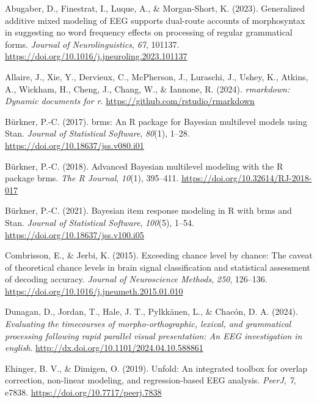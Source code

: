 \documentclass[
  doc,
  floatsintext,
  longtable,
  a4paper,
  nolmodern,
  notxfonts,
  notimes,
  colorlinks=true,linkcolor=blue,citecolor=blue,urlcolor=blue]{apa7}
\newlength{\cslhangindent}
\newenvironment{CSLReferences}[2] %
 {\begin{list}{}{%
  \setlength{\itemindent}{0pt}
  \setlength{\leftmargin}{0pt}
  \setlength{\parsep}{0pt}
  \ifodd #1
   \setlength{\leftmargin}{\cslhangindent}
   \setlength{\itemindent}{-1\cslhangindent}
  \fi
  \setlength{\itemsep}{#2\baselineskip}}}
 {\end{list}}
\begin{document}
\label{refs}
\begin{CSLReferences}{1}{0}
Abugaber, D., Finestrat, I., Luque, A., \& Morgan-Short, K. (2023).
Generalized additive mixed modeling of EEG supports dual-route accounts
of morphosyntax in suggesting no word frequency effects on processing of
regular grammatical forms. \emph{Journal of Neurolinguistics},
\emph{67}, 101137.
\url{https://doi.org/10.1016/j.jneuroling.2023.101137}

Allaire, J., Xie, Y., Dervieux, C., McPherson, J., Luraschi, J., Ushey,
K., Atkins, A., Wickham, H., Cheng, J., Chang, W., \& Iannone, R.
(2024). \emph{{rmarkdown}: Dynamic documents for r}.
\url{https://github.com/rstudio/rmarkdown}

Bürkner, P.-C. (2017). {brms}: An {R} package for {Bayesian} multilevel
models using {Stan}. \emph{Journal of Statistical Software},
\emph{80}(1), 1--28. \url{https://doi.org/10.18637/jss.v080.i01}

Bürkner, P.-C. (2018). Advanced {Bayesian} multilevel modeling with the
{R} package {brms}. \emph{The R Journal}, \emph{10}(1), 395--411.
\url{https://doi.org/10.32614/RJ-2018-017}

Bürkner, P.-C. (2021). Bayesian item response modeling in {R} with
{brms} and {Stan}. \emph{Journal of Statistical Software},
\emph{100}(5), 1--54. \url{https://doi.org/10.18637/jss.v100.i05}

Combrisson, E., \& Jerbi, K. (2015). Exceeding chance level by chance:
{The} caveat of theoretical chance levels in brain signal classification
and statistical assessment of decoding accuracy. \emph{Journal of
Neuroscience Methods}, \emph{250}, 126--136.
\url{https://doi.org/10.1016/j.jneumeth.2015.01.010}

Dunagan, D., Jordan, T., Hale, J. T., Pylkkänen, L., \& Chacón, D. A.
(2024). \emph{Evaluating the timecourses of morpho-orthographic,
lexical, and grammatical processing following rapid parallel visual
presentation: An EEG investigation in english}.
\url{http://dx.doi.org/10.1101/2024.04.10.588861}

Ehinger, B. V., \& Dimigen, O. (2019). Unfold: An integrated toolbox for
overlap correction, non-linear modeling, and regression-based {EEG}
analysis. \emph{PeerJ}, \emph{7}, e7838.
\url{https://doi.org/10.7717/peerj.7838}


\end{CSLReferences}
\end{document}
